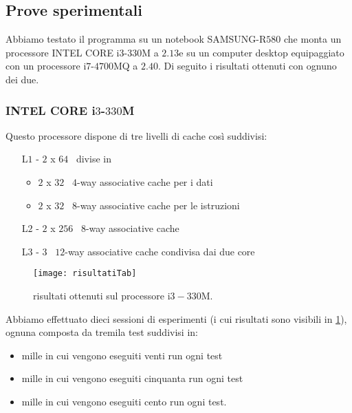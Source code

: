 			\subsection{Prove sperimentali}
				Abbiamo testato il programma su un notebook SAMSUNG-R$580$ che monta un processore INTEL CORE i$3$-$330$M a $2.13$\gigahertz e su un computer desktop equipaggiato con un processore i$7$-$4700$MQ a $2.40$\gigahertz. Di seguito i risultati ottenuti con ognuno dei due.
				
				\subsubsection*{INTEL CORE i$3$-$330$M} 
				
					Questo processore dispone di tre livelli di cache così suddivisi:
					
					\begin{itemize}
						\item [L$1$ -] $2$ x $64$ \kilobyte \ divise in 
						\begin{itemize}
							\item  $2$ x $32$ \kilobyte \ $4$-way associative cache per i dati
							\item  $2$ x $32$ \kilobyte \ $8$-way associative cache per le istruzioni
						\end{itemize}
						\item[L$2$ -] $2$ x $256$ \kilobyte \ $8$-way associative cache
						\item[L$3$ -] $3$ \megabyte \ $12$-way associative cache condivisa dai due core
					\end{itemize}
				
					\begin{figure}
						\begin{center}
							\texttt{[image: risultatiTab]}
							\caption{risultati ottenuti sul processore i$3-330$M.}
							\label{fig:risultati}
						\end{center}
					\end{figure}
				
					Abbiamo effettuato dieci sessioni di esperimenti (i cui risultati sono visibili in \cref{fig:risultati}), ognuna composta da tremila test suddivisi in:
					
					\begin{itemize}
						\item mille in cui vengono eseguiti venti run ogni test
						\item mille in cui vengono eseguiti cinquanta run ogni test
						\item mille in cui vengono eseguiti cento run ogni test.
					\end{itemize}
					

